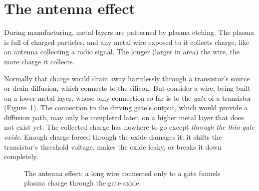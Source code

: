 \section{The antenna effect}
\label{sec:antenna}

During manufacturing, metal layers are patterned by plasma etching. The plasma is full of charged particles, and any metal wire exposed to it collects charge, like an antenna collecting a radio signal. The longer (larger in area) the wire, the more charge it collects.

Normally that charge would drain away harmlessly through a transistor's source or drain diffusion, which connects to the silicon. But consider a wire, being built on a lower metal layer, whose only connection so far is to the \emph{gate} of a transistor (Figure~\ref{fig:antenna}). The connection to the driving gate's output, which would provide a diffusion path, may only be completed later, on a higher metal layer that does not exist yet. The collected charge has nowhere to go except \emph{through the thin gate oxide}. Enough charge forced through the oxide damages it: it shifts the transistor's threshold voltage, makes the oxide leaky, or breaks it down completely.

\begin{figure}[h]
\centering
{}
\caption{The antenna effect: a long wire connected only to a gate funnels plasma charge through the gate oxide.}
\label{fig:antenna}
\end{figure}

